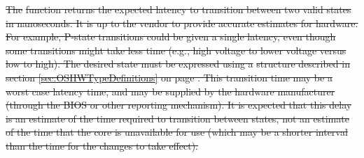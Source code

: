 \documentclass[12pt]{report} %
\providecommand{\DIFdeltex}[1]{{\protect\color{red}\sout{#1}}}                      %
\providecommand{\DIFdelbegin}{} %
\providecommand{\DIFdel}[1]{\texorpdfstring{\DIFdeltex{#1}}{}} %
\newcommand{\DIFscaledelfig}{0.5}
\newlength{\DIFdelgraphicswidth} %
\newlength{\DIFdelgraphicsheight} %
\newcommand{\DIFdelincludegraphics}[2][]{%
\sbox{\DIFdelgraphicsbox}{\DIFOincludegraphics[#1]{#2}}%
\settoboxwidth{\DIFdelgraphicswidth}{\DIFdelgraphicsbox} %
\settoboxtotalheight{\DIFdelgraphicsheight}{\DIFdelgraphicsbox} %
\scalebox{\DIFscaledelfig}{%
\parbox[b]{\DIFdelgraphicswidth}{\usebox{\DIFdelgraphicsbox}\\[-\baselineskip] \rule{\DIFdelgraphicswidth}{0em}}\llap{\resizebox{\DIFdelgraphicswidth}{\DIFdelgraphicsheight}{%
\setlength{\unitlength}{\DIFdelgraphicswidth}%
\begin{picture}(1,1)%
\thicklines\linethickness{2pt} %
{\color[rgb]{1,0,0}\put(0,0){\framebox(1,1){}}}%
{\color[rgb]{1,0,0}\put(0,0){\line( 1,1){1}}}%
{\color[rgb]{1,0,0}\put(0,1){\line(1,-1){1}}}%
\end{picture}%
}\hspace*{3pt}}} %
} %
\DeclareRobustCommand{\DIFdelbegin}{\DIFOdelbegin \let\includegraphics\DIFdelincludegraphics} %
\begin{document}
         



\DIFdelbegin \DIFdel{The }%
\DIFdel{function returns the expected latency to transition between two valid states in nanoseconds. 
It is up to the vendor to provide accurate estimates for hardware. For example, P-state transitions could be given 
a single latency, even though some transitions might take less time (e.g., high voltage to lower voltage versus low to high).
The desired state must be expressed using a }%
\DIFdel{structure described in section \ref{sec:OSHWTypeDefinitions}
on page \pageref{sec:OSHWTypeDefinitions}.
This transition time may be a worst case latency time, and may be supplied by the hardware manufacturer (through the BIOS or
other reporting mechanism). It is expected that this delay is an estimate of the time required to transition between states, not an estimate of the time that the core is unavailable for use (which may be a shorter interval than the time for the changes to take effect).   
}%


\end{document}
